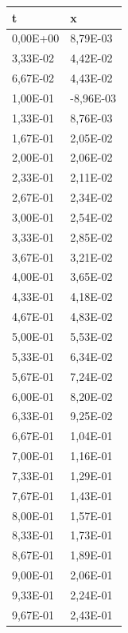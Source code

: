 \documentclass[11p, titlepage, oneside, a4paper]{article}
\begin{document}
    
        \begin{table}
            \centering
            \begin{tabular}{ll}
                \toprule
                \textbf{t} & \textbf{x} \\
                \midrule
                0,00E+00 & 8,79E-03 \\
                3,33E-02 & 4,42E-02 \\
                6,67E-02 & 4,43E-02 \\
                1,00E-01 & -8,96E-03 \\
                1,33E-01 & 8,76E-03 \\
                1,67E-01 & 2,05E-02 \\
                2,00E-01 & 2,06E-02 \\
                2,33E-01 & 2,11E-02 \\
                2,67E-01 & 2,34E-02 \\
                3,00E-01 & 2,54E-02 \\
                3,33E-01 & 2,85E-02 \\
                3,67E-01 & 3,21E-02 \\
                4,00E-01 & 3,65E-02 \\
                4,33E-01 & 4,18E-02 \\
                4,67E-01 & 4,83E-02 \\
                5,00E-01 & 5,53E-02 \\
                5,33E-01 & 6,34E-02 \\
                5,67E-01 & 7,24E-02 \\
                6,00E-01 & 8,20E-02 \\
                6,33E-01 & 9,25E-02 \\
                6,67E-01 & 1,04E-01 \\
                7,00E-01 & 1,16E-01 \\
                7,33E-01 & 1,29E-01 \\
                7,67E-01 & 1,43E-01 \\
                8,00E-01 & 1,57E-01 \\
                8,33E-01 & 1,73E-01 \\
                8,67E-01 & 1,89E-01 \\
                9,00E-01 & 2,06E-01 \\
                9,33E-01 & 2,24E-01 \\
                9,67E-01 & 2,43E-01 \\

\end{tabular}
\end{table}
\end{document}
